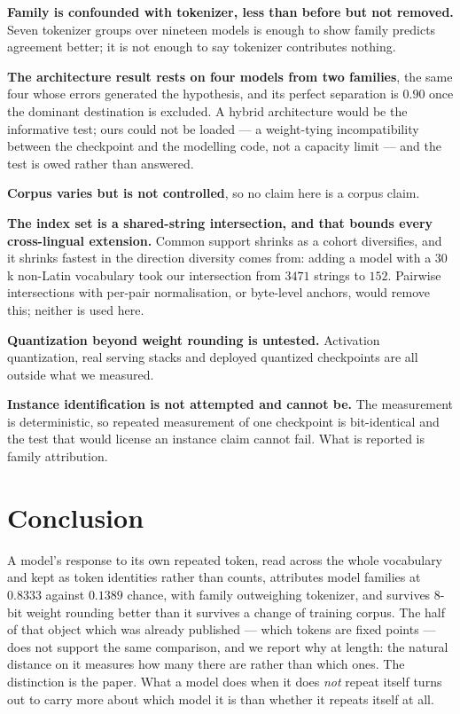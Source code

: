 \documentclass[11pt]{article}
\begin{document}
\textbf{Family is confounded with tokenizer, less than before but not removed.} Seven tokenizer
groups over nineteen models is enough to show family predicts agreement better; it is not enough to
say tokenizer contributes nothing.

\textbf{The architecture result rests on four models from two families}, the same four whose errors
generated the hypothesis, and its perfect separation is $0.90$ once the dominant destination is
excluded. A hybrid architecture would be the
informative test; ours could not be loaded --- a weight-tying incompatibility between the checkpoint
and the modelling code, not a capacity limit --- and the test is owed rather than answered.

\textbf{Corpus varies but is not controlled}, so no claim here is a corpus claim.

\textbf{The index set is a shared-string intersection, and that bounds every cross-lingual
extension.} Common support shrinks as a cohort diversifies, and it shrinks fastest in the direction
diversity comes from: adding a model with a $30$k non-Latin vocabulary took our intersection from
$3471$ strings to $152$. Pairwise intersections with per-pair normalisation, or byte-level anchors,
would remove this; neither is used here.

\textbf{Quantization beyond weight rounding is untested.} Activation quantization, real serving
stacks and deployed quantized checkpoints are all outside what we measured.

\textbf{Instance identification is not attempted and cannot be.} The measurement is deterministic, so
repeated measurement of one checkpoint is bit-identical and the test that would license an instance
claim cannot fail. What is reported is family attribution.

\section{Conclusion}

A model's response to its own repeated token, read across the whole vocabulary and kept as token
identities rather than counts, attributes model families at $0.8333$ against $0.1389$ chance, with
family outweighing tokenizer, and survives $8$-bit weight rounding better than it survives a change
of training corpus. The half of that object which was already published --- which tokens are fixed
points --- does not support the same comparison, and we report why at length: the natural distance on
it measures how many there are rather than which ones. The distinction is the paper. What a model
does when it does \emph{not} repeat itself turns out to carry more about which model it is than
whether it repeats itself at all.



\end{document}
